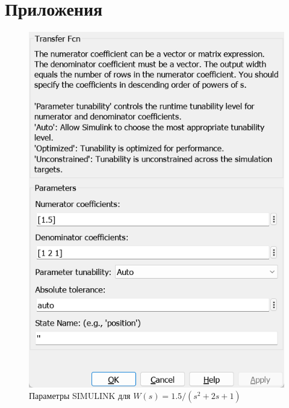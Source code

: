 \documentclass[a4paper, 12pt]{article}
\begin{document}
    \section{Приложения}
    \begin{figure}[H]
        \centering
        \includegraphics[scale=0.6]{task1_tfcn_window.png}
        \captionsetup{skip=0pt}
        \caption{Параметры SIMULINK для $W(s)=1.5/(s^2+2s+1)$}
        \label{fig:task1_tfcn_window}
    \end{figure}
\end{document}
